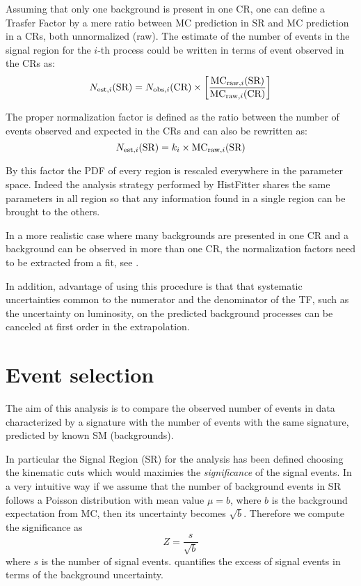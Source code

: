 Assuming that only one background is present in one CR, one can define a Trasfer Factor by a mere ratio between MC prediction in SR and MC prediction in a CRs, both unnormalized (raw). The estimate of the number of events in the signal region for the $i$-th process could be written in terms of event observed in the CRs as:
\begin{equation}
  \label{eqn:TF}
  N_{\textup{est},i}(\text{SR}) =  N_{\textup{obs},i}({\text{CR}}) \times \left[\frac{\text{MC}_{\textup{raw},i}(\text{SR})}{\text{MC}_{\textup{raw},i}(\text{CR})} \right]
\end{equation}

The proper normalization factor is defined as the ratio between the number of events observed and expected in the CRs and \Eqn{\ref{eqn:TF}} can also be rewritten as:
\begin{equation}
  N_{\textup{est},i}(\text{SR}) = k_{i}\times\text{MC}_{\textup{raw},i}(\text{SR})
\end{equation}

By this factor the PDF of every region is rescaled everywhere in the parameter space. Indeed the analysis strategy performed by HistFitter shares the same parameters in all region so that any information found in a single region can be brought to the others.

In a more realistic case where many backgrounds are presented in one CR and a background can be observed in more than one CR, the normalization factors need to be extracted from a fit, see \Sect{\ref{sec:simfit}}.

In addition, advantage of using this procedure is that that systematic uncertainties common to the numerator and the denominator of the TF, such as the uncertainty on luminosity, on the predicted background processes can be canceled at first order in the extrapolation.

\section{Event selection}
\label{sec:SRselection}
The aim of this analysis is to compare the observed number of events in data characterized by a \mph signature with the number of events with the same signature, predicted by known SM (backgrounds).

In particular the Signal Region (SR) for the \mph analysis has been defined choosing the kinematic cuts which would maximies the \emph{significance} of the signal events. In a very intuitive way if we assume that the number of background events in SR follows a Poisson distribution with mean value $\mu=b$, where $b$ is the background expectation from MC, then its uncertainty becomes $\sqrt{b}$. Therefore we compute the significance as
\begin{equation}
  Z=\frac{s}{\sqrt{b}}
  \label{eqn:significance}
\end{equation}
where $s$ is the number of signal events. \Eqn{\ref{eqn:significance}} quantifies the excess of signal events in terms of the background uncertainty. 

